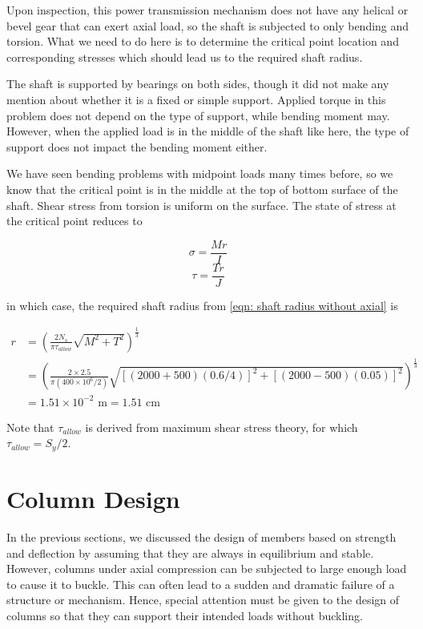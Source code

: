 \documentclass[a4paper,openany,12pt]{book}
\begin{document}
{{Upon inspection, this power transmission mechanism does not have any
helical or bevel gear that can exert axial load, so the shaft is
subjected to only bending and torsion. What we need to do here is to
determine the critical point location and corresponding stresses which
should lead us to the required shaft radius.

The shaft is supported by bearings on both sides, though it did not make
any mention about whether it is a fixed or simple support. Applied
torque in this problem does not depend on the type of support, while
bending moment may. However, when the applied load is in the middle of
the shaft like here, the type of support does not impact the bending
moment either.

We have seen bending problems with midpoint loads many times before, so
we know that the critical point is in the middle at the top of bottom
surface of the shaft. Shear stress from torsion is uniform on the
surface. The state of stress at the critical point reduces to

$$\sigma = \frac{Mr}{I}$$ $$\tau = \frac{Tr}{J}$$

in which case, the required shaft radius from
\ref{eqn: shaft radius without axial}
is

$$\begin{aligned}
    r &= \left( \frac{2 N_s}{\pi \tau _{allow}}\sqrt {M^2 +T^2}  \right)^{\frac{1}{3}} \\
      &= \left( \frac{2 \times 2.5}{\pi (400 \times 10^6 /2 )}\sqrt {[(2000+500)(0.6/4)]^2 +[(2000-500)(0.05)]^2}  \right)^{\frac{1}{3}} \\
      &= 1.51 \times 10^{-2} \text{ m} = 1.51 \text{ cm}
  \end{aligned}$$

Note that \(\tau_{allow}\) is derived from maximum shear stress theory,
for which \(\tau_{allow} = S_y/2\).

\section{Column Design}
\label{column-design}
In the previous sections, we discussed the design of members based on
strength and deflection by assuming that they are always in equilibrium
and stable. However, columns under axial compression can be subjected to
large enough load to cause it to buckle. This can often lead to a sudden
and dramatic failure of a structure or mechanism. Hence, special
attention must be given to the design of columns so that they can
support their intended loads without buckling.

}}
\end{document}

